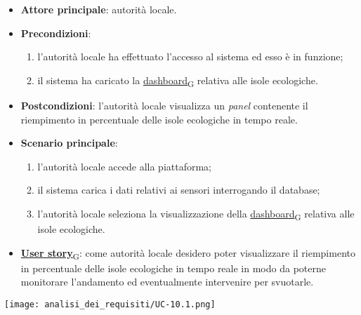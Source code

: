 \begin{itemize}
	\item \textbf{Attore principale}: autorità locale.
	\item \textbf{Precondizioni}:
	      \begin{enumerate}
		      \item l'autorità locale ha effettuato l'accesso al sistema ed esso è in funzione;
		      \item il sistema ha caricato la \href{https://7last.github.io/docs/rtb/documentazione-interna/glossario\#dashboard}{dashboard\textsubscript{G}} relativa alle isole ecologiche.
	      \end{enumerate}
	\item \textbf{Postcondizioni}: l'autorità locale visualizza un \textit{panel} contenente il riempimento in percentuale delle isole ecologiche in tempo reale.
	\item \textbf{Scenario principale}:
	      \begin{enumerate}
		      \item l'autorità locale accede alla piattaforma;
		      \item il sistema carica i dati relativi ai sensori interrogando il database;
		      \item l'autorità locale seleziona la visualizzazione della \href{https://7last.github.io/docs/rtb/documentazione-interna/glossario\#dashboard}{dashboard\textsubscript{G}} relativa alle isole ecologiche.
	      \end{enumerate}
	\item \href{https://7last.github.io/docs/rtb/documentazione-interna/glossario\#user-story}{\textbf{User story}\textsubscript{G}}:
	      come autorità locale desidero poter visualizzare il riempimento in percentuale delle isole ecologiche in tempo reale in modo da poterne monitorare l'andamento
	      ed eventualmente intervenire per svuotarle.
\end{itemize}
\begin{center}
	\texttt{[image: analisi\_dei\_requisiti/UC-10.1.png]}
\end{center}

\newpage


